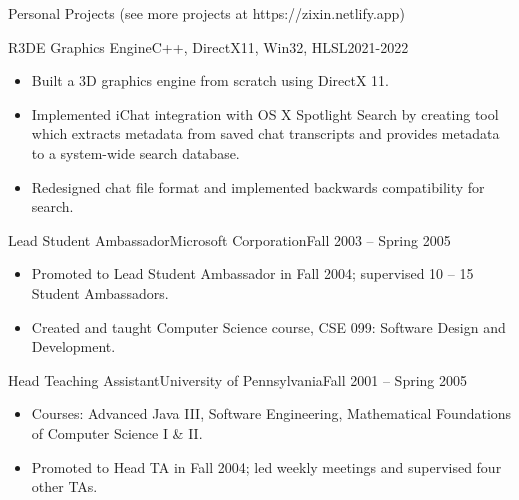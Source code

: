 \documentclass[]{mcdowellcv}
\begin{document}
	\begin{cvsection}{Personal Projects (see more projects at https://zixin.netlify.app)}
		\begin{cvsubsection}{R3DE Graphics Engine}{C++, DirectX11, Win32, HLSL}{2021-2022}			
			\begin{itemize}
				\item Built a 3D graphics engine from scratch using DirectX 11.
				\item Implemented iChat integration with OS X Spotlight Search by creating tool which extracts metadata from saved chat transcripts and provides metadata to a system-wide search database.
				\item Redesigned chat file format and implemented backwards compatibility for search.
			\end{itemize}
		\end{cvsubsection}
		
		\begin{cvsubsection}{Lead Student Ambassador}{Microsoft Corporation}{Fall 2003 -- Spring 2005}	
			\begin{itemize}
				\item Promoted to Lead Student Ambassador in Fall 2004; supervised 10 -- 15 Student Ambassadors.
				\item Created and taught Computer Science course, CSE 099: Software Design and Development.
			\end{itemize}
		\end{cvsubsection}
		
		\begin{cvsubsection}{Head Teaching Assistant}{University of Pennsylvania}{Fall 2001 -- Spring 2005}		
			\begin{itemize}
				\item Courses: Advanced Java III, Software Engineering, Mathematical Foundations of Computer Science I \& II.
				\item Promoted to Head TA in Fall 2004; led weekly meetings and supervised four other TAs.
			\end{itemize}
		\end{cvsubsection}
	\end{cvsection}
	
\end{document}

